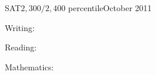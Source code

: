 \documentclass{resume}
\newcommand{\IB}[0]{\DepartmentTitle{IB Coursework}{}}
\newcommand{\Southridge}[0]{\UniversityTitle{Southridge High School}{}}
\begin{document}
  \begin{rSubSection}{SAT\hspace{8.9em}$2,300/2,400$\hspace{4.3em}\normalfont{} percentile}{October 2011}{}{}
  \item Writing:~\tab\tab{}\tab{}
  \item Reading:~\tab\tab{}\tab{}
  \item Mathematics:~\tab{}\tab{}
  \end{rSubSection}




\end{document}
